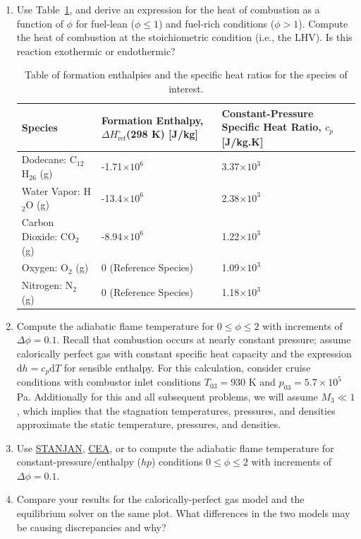 \documentclass[11pt]{article}
\begin{document}
\begin{enumerate}[label=(\alph*)]
	\item
    	Use Table~\ref{TAB_HEATS}, and derive an expression for the heat of combustion as a function of $\phi$ for fuel-lean ($\phi\le 1$) and fuel-rich conditions ($\phi>1$). Compute the heat of combustion at the stoichiometric condition (i.e., the LHV). Is this reaction exothermic or endothermic?
         \begin{table}[!htb!]
        	\centering
        	\begin{tabular}{|p{}|p{}|p{}|}\hline
        Species & Formation Enthalpy, $\Delta H_\mathrm{ref}^\circ$(298 K) [J/kg]& Constant-Pressure Specific Heat Ratio, $c_p$ [J/kg.K] \\ \hline
        Dodecane: C$_{12}$H$_{26}$ (g) & -1.71$\times 10^6$ & 3.37$\times 10^3$ \\
        Water Vapor: H$_{2}$O (g) & -13.4$\times 10^6$ &  2.38$\times 10^3$\\
        Carbon Dioxide: CO$_{2}$ (g) & -8.94$\times 10^6$  & 1.22$\times 10^3$\\
        Oxygen: O$_{2}$ (g) & 0 (Reference Species) & 1.09$\times 10^3$\\
        Nitrogen: N$_{2}$ (g) & 0 (Reference Species) & 1.18$\times 10^3$\\
        \hline
        \end{tabular}
          \caption{\label{TAB_HEATS}Table of formation enthalpies and the specific heat ratios for the species of interest.}
          \end{table}
    \item
    	Compute the adiabatic flame temperature for $0 \le \phi \le 2$ with increments of $\Delta \phi=0.1$.  Recall that combustion occurs at nearly constant pressure; assume calorically perfect gas with constant specific heat capacity and the expression $\mathrm{d} h=c_p\mathrm{d}T$ for sensible enthalpy. For this calculation, consider cruise conditions with combustor inlet conditions $T_{03}=930$ K and $p_{03} = 5.7\times 10^5$ Pa. Additionally for this and all subsequent problems, we will assume $M_3\ll 1$, which implies that the stagnation temperatures, pressures, and densities approximate the static temperature, pressures, and densities.
    \item
    	Use \href{http://navier.engr.colostate.edu/~dandy/code/code-4/}{STANJAN}, \href{https://cearun.grc.nasa.gov/}{CEA}, or \href{http://www.cantera.org/docs/sphinx/html/index.html}{{}} to compute the adiabatic flame temperature for constant-pressure/enthalpy ($hp$) conditions $0 \le \phi \le 2$ with increments of $\Delta \phi=0.1.$ 
    \item
    	Compare your results for the calorically-perfect gas model and the equilibrium solver on the same plot. What differences in the two models may be causing discrepancies and why? 
\end{enumerate}	
\end{document}
